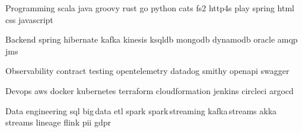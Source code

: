 
\begin{cvskills}

    \cvskill
    {Programming}
    {scala {} java {} groovy {} rust {} go {} python {} cats {} fs2 {} http4s {} play {} spring {} html {} css {} javascript}

    \cvskill
    {Backend}
    {spring {} hibernate {} kafka {} kinesis {} ksqldb {} mongodb {} dynamodb {} oracle {} amqp {} jms}

    \cvskill
    {Observability}
    {contract testing {} opentelemetry {} datadog {} smithy {} openapi {} swagger}

    \cvskill
    {Devops}
    {aws {} docker {} kubernetes {} terraform {} cloudformation {} jenkins {} circleci {} argocd}

    \cvskill
    {Data engineering}
    {sql {} big\,data {} etl {} spark {} spark\,streaming {} kafka\,streams {} akka\,streams {} lineage {} flink {} pii {} gdpr}

%

\end{cvskills}
